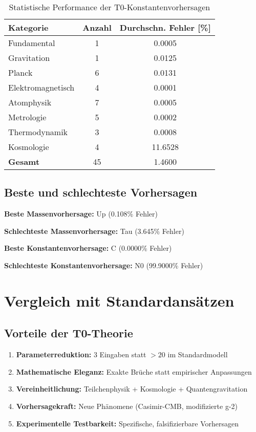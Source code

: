 \documentclass[11pt,a4paper]{article}
\begin{document}
	\begin{table}[h]
		\centering
		\begin{tabular}{>{\raggedright}p{4cm}cc}
			\toprule
			\textbf{Kategorie} & \textbf{Anzahl} & \textbf{Durchschn. Fehler [\%]} \\
			\midrule
			Fundamental & 1 & 0.0005 \\
			Gravitation & 1 & 0.0125 \\
			Planck & 6 & 0.0131 \\
			Elektromagnetisch & 4 & 0.0001 \\
			Atomphysik & 7 & 0.0005 \\
			Metrologie & 5 & 0.0002 \\
			Thermodynamik & 3 & 0.0008 \\
			Kosmologie & 4 & 11.6528 \\
			\midrule
			\textbf{Gesamt} & 45 & 1.4600 \\
			\bottomrule
		\end{tabular}
		\caption{Statistische Performance der T0-Konstantenvorhersagen}
	\end{table}
	
	\subsection{Beste und schlechteste Vorhersagen}
	
	\textbf{Beste Massenvorhersage:} Up (0.108\% Fehler)
	
	\textbf{Schlechteste Massenvorhersage:} Tau (3.645\% Fehler)
	
	\textbf{Beste Konstantenvorhersage:} C (0.0000\% Fehler)
	
	\textbf{Schlechteste Konstantenvorhersage:} N0 (99.9000\% Fehler)
	
	\section{Vergleich mit Standardans\"{a}tzen}
	
	\subsection{Vorteile der T0-Theorie}
	
	\begin{enumerate}
		\item \textbf{Parameterreduktion:} 3 Eingaben statt $>20$ im Standardmodell
		\item \textbf{Mathematische Eleganz:} Exakte Br\"{u}che statt empirischer Anpassungen
		\item \textbf{Vereinheitlichung:} Teilchenphysik + Kosmologie + Quantengravitation
		\item \textbf{Vorhersagekraft:} Neue Ph\"{a}nomene (Casimir-CMB, modifizierte g-2)
		\item \textbf{Experimentelle Testbarkeit:} Spezifische, falsifizierbare Vorhersagen
	\end{enumerate}
	
\end{document}
